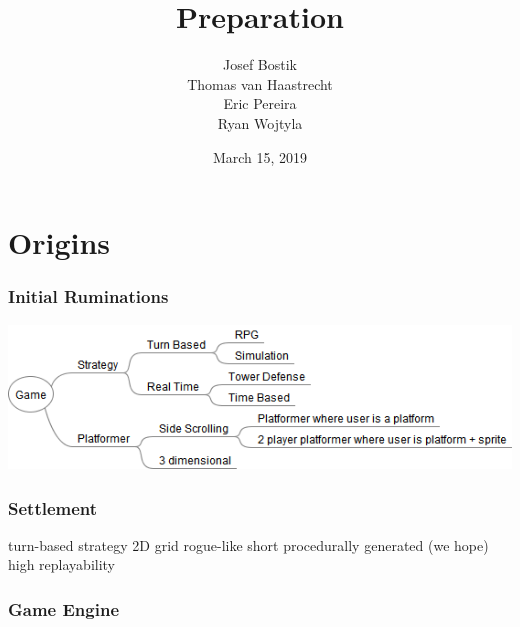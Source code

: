 \documentclass[ascpectratio=169]{beamer}
\title{Preparation}
\author[]{Josef Bostik\\
  Thomas van Haastrecht\\
  Eric Pereira\\
  Ryan Wojtyla}
\date{March 15, 2019}
\begin{document}

\begin{frame}
  \titlepage
\end{frame}


\section{Origins}


\begin{frame}

  \frametitle{Initial Ruminations}

  \begin{center}
    \includegraphics[scale=0.5]{../../Diagrams/Game/Game.png}
  \end{center}

\end{frame}



\begin{frame}

  \frametitle{Settlement}

  \begin{outline}
    \1 turn-based strategy
    \1 2D grid
    \1 rogue-like
      \2 short
      \2 procedurally generated (we hope)
      \2 high replayability
  \end{outline}

\end{frame}



\begin{frame}

  \frametitle{Game Engine}


\end{frame}
\end{document}
